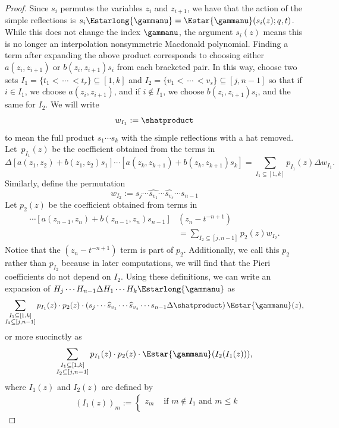 \begin{proof}
Since $s_i$ permutes the variables $z_i$ and $z_{i+1}$, we have that the action of the simple reflections is $s_i\Estarlong{\gammanu} = \Estar{\gammanu}(s_i(z);q,t)$. While this does not change the index $\gammanu$, the argument $s_i(z)$ means this is no longer an interpolation nonsymmetric Macdonald polynomial. Finding a term after expanding the above product corresponds to choosing either $a(z_i,z_{i+1})$ or $b(z_i,z_{i+1}) s_i$ from each bracketed pair. In this way, choose two sets $I_1=\{t_1< \, \dotsm \, < t_r\} \subseteq [1,k]$ and $I_2=\{v_1< \, \dotsm \, < v_s\} \subseteq [j,n-1]$ so that if $i\in I_1$, we choose $a(z_i,z_{i+1})$, and if $i\notin I_1$, we choose $b(z_i,z_{i+1})s_i$, and the same for $I_2$. We will write
\[ w_{I_1} := \shatproduct \]
to mean the full product $s_1 \dotsm s_k$ with the simple reflections with a hat removed. Let~$p_{I_1}(z)$ be the coefficient obtained from the terms in
\[ \Delta [a(z_1, z_2)+b(z_1,z_2) s_1] \dotsm [a(z_k,z_{k+1}) + b(z_k,z_{k+1})s_k] = \sum_{I_1\subseteq [1,k]} p_{I_1}(z) \Delta w_{I_1}.\]
Similarly, define the permutation
\[w_{I_2} := s_j \dotsm \widehat{s_{v_1}} \dotsm \widehat{s_{v_s}} \dotsm s_{n-1} \]
Let $p_{2}(z)$  be the coefficient obtained from terms in
\begin{align*} [a(z_j,z_{j+1})+b(z_j,z_{j+1}) s_j] \dotsm [a(z_{n-1},z_n)+b(z_{n-1},z_n) s_{n-1}] &(z_n-t^{-n+1})\\ &=\sum_{I_2\subseteq[j,n-1]}p_2(z)w_{I_2}.\end{align*}
Notice that the $(z_n-t^{-n+1})$ term is part of $p_2$. Additionally, we call this $p_2$ rather than $p_{I_2}$ because in later computations, we will find that the Pieri coefficients do not depend on $I_2$. Using these definitions, we can write an expansion of $\displaystyle{H_j \dotsm H_{n-1} \Delta H_1 \dotsm H_k  \Estarlong{\gammanu}}$ as
\begin{equation}\label{Expandedright}
      \sum\limits_{\substack{I_1 \subseteq [1,k] \\ I_2 \subseteq [j, n-1]}} p_{I_1}(z) \cdot p_2(z)  \cdot \left( s_j \dotsm \widehat{s}_{v_1} \dotsm \widehat{s}_{v_s} \dotsm s_{n-1}\Delta \shatproduct \right) \Estar{\gammanu}(z), \end{equation}
or more succinctly as
   \[ \sum\limits_{\substack{I_1 \subseteq [1,k] \\ I_2 \subseteq [j, n-1]}} p_{I_1}(z) \cdot p_2(z)  \cdot \Estar{\gammanu}(I_2(I_1(z))),
\]
where $I_1(z)$ and $I_2(z)$ are defined by
\begin{align} \label{Ione}&(I_1(z))_m := \begin{cases} z_m  &\text{ if } m\notin I_1 \text{ and } m \leq k \\

\end{cases}
\end{align}
\end{proof}
